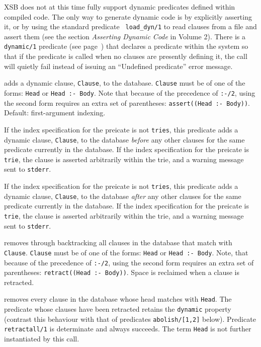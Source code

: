 XSB does not at this time fully support dynamic predicates defined
within compiled code.  The only way to generate dynamic code is by
explicitly asserting it, or by using the standard predicate {\tt
load\_dyn/1} to read clauses from a file and assert them (see
the section {\it Asserting Dynamic Code} in Volume 2).  There is a
{\tt dynamic/1} predicate (see 
page~\pageref{dynamic/1}) that declares a predicate within the system
so that if the predicate is called when no clauses are presently
defining it, the call will quietly fail instead of issuing an {\sf
``Undefined predicate''} error message.

\begin{description}

adds a dynamic clause, {\tt Clause}, to the database. {\tt Clause}
must be of one of the forms: {\tt Head} or {\tt Head :- Body}. Note
that because of the precedence of {\tt :-/2}, using the second form
requires an extra set of parentheses: {\tt assert((Head :- Body))}.
Default: first-argument indexing.

If the index specification for the preicate is not {\tt tries}, this
predicate adds a dynamic clause, {\tt Clause}, to the database {\em
before} any other clauses for the same predicate currently in the
database.  If the index specification for the preicate is {\tt trie},
the clause is asserted arbitrarily within the trie, and a warning
message sent to {\tt stderr}.


If the index specification for the preicate is not {\tt tries}, this
predicate adds a dynamic clause, {\tt Clause}, to the database {\em
after} any other clauses for the same predicate currently in the
database.  If the index specification for the preicate is {\tt trie},
the clause is asserted arbitrarily within the trie, and a warning
message sent to {\tt stderr}.

removes through backtracking all clauses in the database that match with
{\tt Clause}.  {\tt Clause} must be of one of the forms:  {\tt Head} or
{\tt Head :- Body}.  Note, that because of the precedence of {\tt :-/2},
using the second form requires an extra set of parentheses:
{\tt retract((Head :- Body))}.  Space is reclaimed when a 
clause is retracted.

removes every clause in the database whose head matches with {\tt Head}.
The predicate whose clauses have been retracted retains the {\tt dynamic}
property (contrast this behaviour with that of predicates 
{\tt abolish/[1,2]} below).
Predicate {\tt retractall/1} is determinate and always succeeds.
The term {\tt Head} is not further instantiated by this call.


\end{description}
